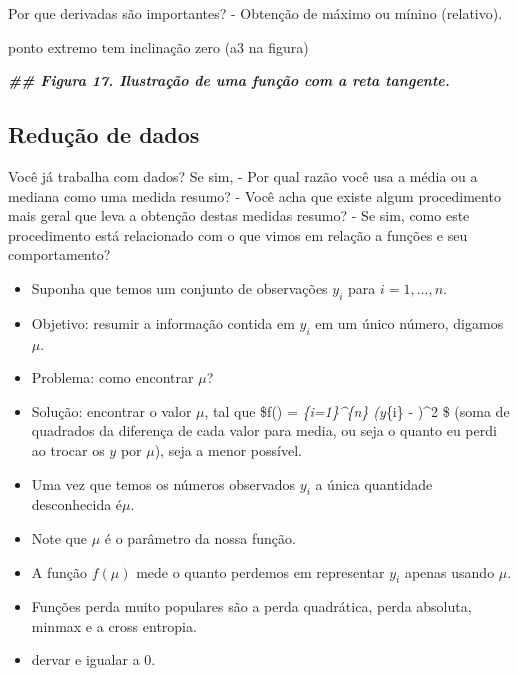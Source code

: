 \documentclass[
]{article}
\newenvironment{Shaded}{\begin{snugshade}}{\end{snugshade}}
\newcommand{\DocumentationTok}[1]{\textcolor[rgb]{0.56,0.35,0.01}{\textbf{\textit{#1}}}}
\providecommand{\tightlist}{%
  \setlength{\itemsep}{0pt}\setlength{\parskip}{0pt}}
\begin{document}
Por que derivadas são importantes? - Obtenção de máximo ou mínino
(relativo).

ponto extremo tem inclinação zero (a3 na figura)

\begin{Shaded}
\begin{Highlighting}[]
\DocumentationTok{\#\# Figura 17. Ilustração de uma função com a reta tangente.}
\end{Highlighting}
\end{Shaded}

\hypertarget{reduuxe7uxe3o-de-dados}{%
\subsection{Redução de dados}\label{reduuxe7uxe3o-de-dados}}

Você já trabalha com dados? Se sim, - Por qual razão você usa a média ou
a mediana como uma medida resumo? - Você acha que existe algum
procedimento mais geral que leva a obtenção destas medidas resumo? - Se
sim, como este procedimento está relacionado com o que vimos em relação
a funções e seu comportamento?

\begin{itemize}
\tightlist
\item
  Suponha que temos um conjunto de observações \(y_{i}\) para
  \(i = 1, … , n\).
\item
  Objetivo: resumir a informação contida em \(y_{i}\) em um único
  número, digamos \(\mu\).
\item
  Problema: como encontrar \(\mu\)?
\item
  Solução: encontrar o valor \(\mu\), tal que \$f(\mu) =
  \sum\emph{\{i=1\}\^{}\{n\} (y}\{i\} - \mu)\^{}2 \$ (soma de quadrados
  da diferença de cada valor para media, ou seja o quanto eu perdi ao
  trocar os \(y\) por \(\mu\)), seja a menor possível.
\item
  Uma vez que temos os números observados \(y_{i}\) a única quantidade
  desconhecida é\(\mu\).
\item
  Note que \(\mu\) é o parâmetro da nossa função.
\item
  A função \(f(\mu)\) mede o quanto perdemos em representar \(y_{i}\)
  apenas usando \(\mu\).
\item
  Funções perda muito populares são a perda quadrática, perda absoluta,
  minmax e a cross entropia.
\item
  dervar e igualar a 0.
\end{itemize}
\end{document}
